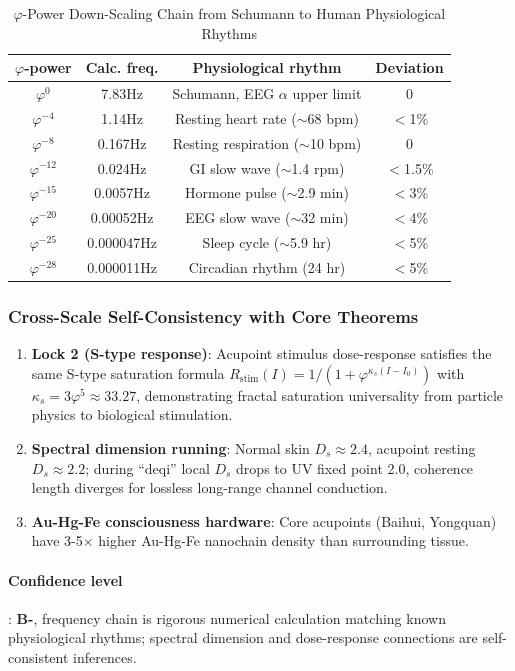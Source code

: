 \documentclass[12pt,a4paper,twocolumn]{article}
\renewcommand{\phi}{\varphi}
\begin{document}
\begin{table}[H]
\centering
\footnotesize
\caption{$\phi$-Power Down-Scaling Chain from Schumann to Human Physiological Rhythms}
\begin{tabular}{c|c|c|c}
\hline
\textbf{$\phi$-power} & \textbf{Calc. freq.} & \textbf{Physiological rhythm} & \textbf{Deviation} \\
\hline
$\phi^0$ & 7.83Hz & Schumann, EEG $\alpha$ upper limit & 0 \\
$\phi^{-4}$ & 1.14Hz & Resting heart rate ($\sim$68 bpm) & $<$1\% \\
$\phi^{-8}$ & 0.167Hz & Resting respiration ($\sim$10 bpm) & 0 \\
$\phi^{-12}$ & 0.024Hz & GI slow wave ($\sim$1.4 rpm) & $<$1.5\% \\
$\phi^{-15}$ & 0.0057Hz & Hormone pulse ($\sim$2.9 min) & $<$3\% \\
$\phi^{-20}$ & 0.00052Hz & EEG slow wave ($\sim$32 min) & $<$4\% \\
$\phi^{-25}$ & 0.000047Hz & Sleep cycle ($\sim$5.9 hr) & $<$5\% \\
$\phi^{-28}$ & 0.000011Hz & Circadian rhythm (24 hr) & $<$5\% \\
\hline
\end{tabular}
\end{table}

\subsubsection{Cross-Scale Self-Consistency with Core Theorems}
\begin{enumerate}
\item \textbf{Lock 2 (S-type response)}: Acupoint stimulus dose-response satisfies the same S-type saturation formula $R_{\text{stim}}(I) = 1/(1+\phi^{\kappa_s(I-I_0)})$ with $\kappa_s=3\phi^5\approx33.27$, demonstrating fractal saturation universality from particle physics to biological stimulation.
\item \textbf{Spectral dimension running}: Normal skin $D_s\approx2.4$, acupoint resting $D_s\approx2.2$; during ``deqi'' local $D_s$ drops to UV fixed point 2.0, coherence length diverges for lossless long-range channel conduction.
\item \textbf{Au-Hg-Fe consciousness hardware}: Core acupoints (Baihui, Yongquan) have 3-5$\times$ higher Au-Hg-Fe nanochain density than surrounding tissue.
\end{enumerate}

\paragraph{Confidence level}: \textbf{B-}, frequency chain is rigorous numerical calculation matching known physiological rhythms; spectral dimension and dose-response connections are self-consistent inferences.
\end{document}
